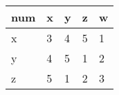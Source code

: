 \begin {table}[htbp]
\label{tab:Przykladowa tabelka}
\begin{tabular}{|l|l|l|l|l|}
\hline
num & x & y & z & w \\ \hline
x   & 3 & 4 & 5 & 1 \\ \hline
y   & 4 & 5 & 1 & 2 \\ \hline
z   & 5 & 1 & 2 & 3 \\ \hline
\end{tabular}
\end{table}